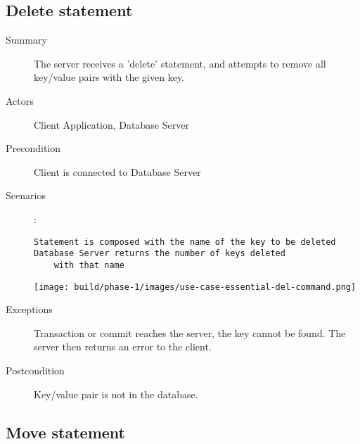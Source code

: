 \documentclass[a4paper]{report}
\begin{document}
	\pagebreak

	\subsection{Delete statement}

	\begin{description}
		\item[Summary] The server receives a 'delete' statement, and attempts to remove all key/value pairs with the given key.
		\item[Actors] Client Application, Database Server
		\item[Precondition] Client is connected to Database Server
		\item[Scenarios] :
		
		\begin{lstlisting}
Statement is composed with the name of the key to be deleted
Database Server returns the number of keys deleted
	with that name
		\end{lstlisting}

		\begin{center}
			\texttt{[image: build/phase-1/images/use-case-essential-del-command.png]}
		\end{center}

		\item[Exceptions] Transaction or commit reaches the server, the key cannot be found. The server then returns an error to the client.
		\item[Postcondition] Key/value pair is not in the database.
	\end{description}
	
	\pagebreak

	\subsection{Move statement}
\end{document}
